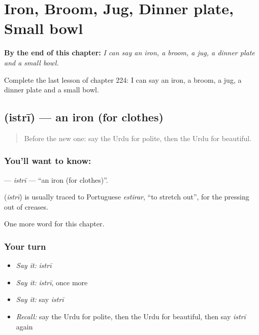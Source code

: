 
\chapter{Iron, Broom, Jug, Dinner plate, Small bowl}
\label{ch:ur-iron-broom-jug-dinner-plate-small-bowl}

\begin{chapteropening}
\textbf{By the end of this chapter:} \emph{I can say an iron, a broom, a jug, a dinner plate and a small bowl.}

Complete the last lesson of chapter 224: I can say an iron, a broom, a jug, a dinner plate and a small bowl.
\end{chapteropening}

\section[\texorpdfstring{\ur{استری} (istrī)}{استری (istrī)}]{ (istrī) — an iron (for clothes)}

\label{lesson:UR-C224-istri}



\begin{quote}
Before the new one: say the Urdu for polite, then the Urdu for beautiful.
\end{quote}

\subsection*{You'll want to know: }
\textbf{} — \emph{istrī} — \textquotedblleft{}an iron (for clothes)\textquotedblright{}.

\begin{cousinweb}
\textbf{} (\emph{istrī}) is usually traced to Portuguese \emph{estirar}, \textquotedblleft{}to stretch out\textquotedblright{}, for the pressing out of creases.
\end{cousinweb}

\begin{grammarlens}[title={What you've built}]
One more word for this chapter.
\end{grammarlens}

\subsection*{Your turn}
\begin{itemize}
\raggedright
  \item \emph{Say it:} \emph{istrī}
  \item \emph{Say it:} \emph{istrī}, once more
  \item \emph{Say it:} say \emph{istrī}
  \item \emph{Recall:} say the Urdu for polite, then the Urdu for beautiful, then say \emph{istrī} again
\end{itemize}

